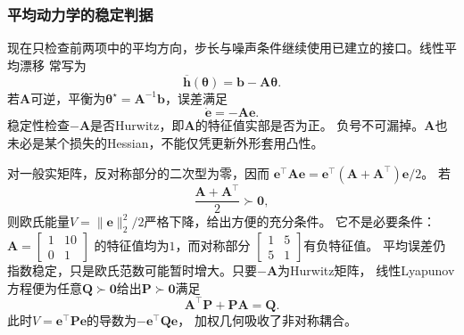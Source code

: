\subsubsection{平均动力学的稳定判据}
\label{sec:dynamical-mean-dynamics-linear-recursion}

现在只检查前两项中的平均方向，步长与噪声条件继续使用已建立的接口。线性平均漂移
常写为
\begin{equation}
  \overline{\bm h}(\bm\theta)=\bm b-\bm A\bm\theta.
  \label{eq:dynamical-linear-mean-drift}
\end{equation}
若$\bm A$可逆，平衡为$\bm\theta^\star=\bm A^{-1}\bm b$，误差满足
\begin{equation}
  \dot{\bm e}=-\bm A\bm e.
  \label{eq:dynamical-linear-mean-error-ode}
\end{equation}
稳定性检查$-\bm A$是否Hurwitz，即$\bm A$的特征值实部是否为正。
负号不可漏掉。$\bm A$也未必是某个损失的Hessian，不能仅凭更新外形套用凸性。

对一般实矩阵，反对称部分的二次型为零，因而
$\bm e^\top\bm A\bm e=\bm e^\top(\bm A+\bm A^\top)\bm e/2$。
若
\begin{equation}
  \frac{\bm A+\bm A^\top}{2}\succ\bm0,
  \label{eq:dynamical-positive-symmetric-part}
\end{equation}
则欧氏能量$V=\|\bm e\|_2^2/2$严格下降，给出方便的充分条件。
它不是必要条件：$\bm A=\left[\begin{smallmatrix}1&10\\0&1\end{smallmatrix}\right]$
的特征值均为$1$，而对称部分
$\left[\begin{smallmatrix}1&5\\5&1\end{smallmatrix}\right]$有负特征值。
平均误差仍指数稳定，只是欧氏范数可能暂时增大。只要$-\bm A$为Hurwitz矩阵，
线性Lyapunov方程便为任意$\bm Q\succ\bm0$给出$\bm P\succ\bm0$满足
\begin{equation}
  \bm A^\top\bm P+\bm P\bm A=\bm Q.
  \label{eq:dynamical-mean-drift-lyapunov}
\end{equation}
此时$V=\bm e^\top\bm P\bm e$的导数为$-\bm e^\top\bm Q\bm e$，
加权几何吸收了非对称耦合。

